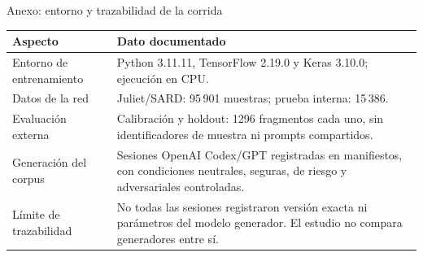 \begin{frame}{Anexo: entorno y trazabilidad de la corrida}
\small
\begin{tabularx}{\textwidth}{@{}p{44mm}X@{}}
\toprule
\textbf{Aspecto} & \textbf{Dato documentado}\\\midrule
Entorno de entrenamiento & Python 3.11.11, TensorFlow 2.19.0 y Keras 3.10.0; ejecución en CPU.\\[2mm]
Datos de la red & Juliet/SARD: 95\,901 muestras; prueba interna: 15\,386.\\[2mm]
Evaluación externa & Calibración y holdout: 1296 fragmentos cada uno, sin identificadores de muestra ni prompts compartidos.\\[2mm]
Generación del corpus & Sesiones OpenAI Codex/GPT registradas en manifiestos, con condiciones neutrales, seguras, de riesgo y adversariales controladas.\\[2mm]
Límite de trazabilidad & No todas las sesiones registraron versión exacta ni parámetros del modelo generador. El estudio no compara generadores entre sí.\\\bottomrule
\end{tabularx}
\end{frame}

